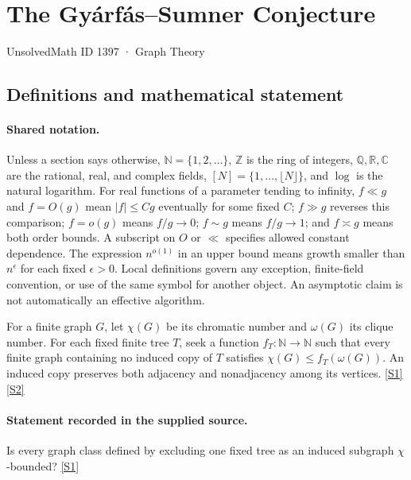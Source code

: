 \documentclass[11pt,a4paper]{article}
\newcommand{\N}{\mathbb{N}}
\newcommand{\Z}{\mathbb{Z}}
\newcommand{\Q}{\mathbb{Q}}
\newcommand{\R}{\mathbb{R}}
\newcommand{\C}{\mathbb{C}}
\newcommand{\sref}[2]{\hyperlink{source:#1:#2}{[S#2]}}
\begin{document}

\setcounter{section}{1396}

\section{The Gyárfás--Sumner Conjecture}\label{1397}

{\small\sffamily UnsolvedMath ID 1397 · Graph Theory}

\subsection{Definitions and mathematical statement}

\paragraph{Shared notation.}Unless a section says otherwise, $\N=\{1,2,\ldots\}$,
$\Z$ is the ring of integers, $\Q,\R,\C$ are the rational, real, and complex
fields, $[N]=\{1,\ldots,\lfloor N\rfloor\}$, and $\log$ is the natural
logarithm. For real functions of a parameter tending to infinity,
$f\ll g$ and $f=O(g)$ mean $|f|\leq Cg$ eventually for some fixed $C$;
$f\gg g$ reverses this comparison; $f=o(g)$ means $f/g\to0$;
$f\sim g$ means $f/g\to1$; and $f\asymp g$ means both order bounds.
A subscript on $O$ or $\ll$ specifies allowed constant dependence.
The expression $n^{o(1)}$ in an upper bound means growth smaller than
$n^\epsilon$ for each fixed $\epsilon>0$. Local definitions govern any
exception, finite-field convention, or use of the same symbol for another
object. An asymptotic claim is not automatically an effective algorithm.



For a finite graph $G$, let $\chi(G)$ be its chromatic number and $\omega(G)$ its clique number. For each fixed finite tree $T$, seek a function $f_T:\N\to\N$ such that every finite graph containing no induced copy of $T$ satisfies $\chi(G)\leq f_T(\omega(G))$. An induced copy preserves both adjacency and nonadjacency among its vertices. \sref{1397}{1} \sref{1397}{2}

\paragraph{Statement recorded in the supplied source.}
Is every graph class defined by excluding one fixed tree as an induced subgraph \ensuremath{χ}-bounded? \sref{1397}{1}
\end{document}
